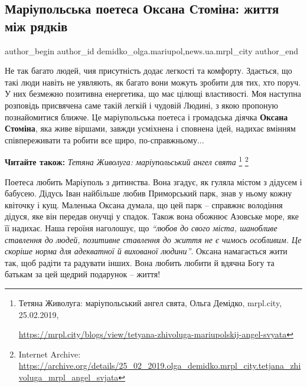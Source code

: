  
 
 
 
 
 
\subsection{Маріупольська поетеса Оксана Стоміна: життя між рядків}
\label{sec:04_03_2019.stz.news.ua.mrpl_city.1.mrpl_poetesa_oksana_stomina_zhyttja_mizh_rjadkiv}
 
\ifcmt
 author_begin
   author_id demidko_olga.mariupol,news.ua.mrpl_city
 author_end
\fi


Не так багато людей, чия присутність додає легкості та комфорту. Здається, що
такі люди навіть не уявляють, як багато вони можуть зробити для тих, хто поруч.
У них безмежно позитивна енергетика, що має цілющі властивості. Моя наступна
розповідь присвячена саме такій легкій і чудовій Людині, з якою пропоную
познайомитися ближче. Це маріупольська поетеса і громадська діячка \textbf{Оксана
Стоміна}, яка живе віршами, завжди усміхнена і сповнена ідей, надихає вмінням
співпереживати та робити все щиро, по-справжньому...

\textbf{Читайте також:} \emph{Тетяна Живолуга: маріупольський ангел свята}%
\footnote{Тетяна Живолуга: маріупольський ангел свята, Ольга Демідко, mrpl.city, 25.02.2019, \par%
\url{https://mrpl.city/blogs/view/tetyana-zhivoluga-mariupolskij-angel-svyata}
} %
\footnote{Internet Archive: \url{https://archive.org/details/25_02_2019.olga_demidko.mrpl_city.tetjana_zhivoluga_mrpl_angel_svjata}}

Поетеса любить Маріуполь з дитинства. Вона згадує, як гуляла містом з дідусем і
бабусею. Дідусь Іван найбільше любив Приморський парк, знав у ньому кожну
квіточку і кущ. Маленька Оксана думала, що цей парк – справжнє володіння
дідуся, яке він передав онучці у спадок. Також вона обожнює Азовське море, яке
її надихає. Наша героїня наголошує, що \emph{\enquote{любов до свого міста, шанобливе
ставлення до людей, позитивне ставлення до життя не є чимось особливим. Це
скоріше норма для адекватної й вихованої людини}}. Оксана намагається жити так,
щоб радіти та радувати інших. Вона любить любити й вдячна Богу та батькам за
цей щедрий подарунок – життя!

